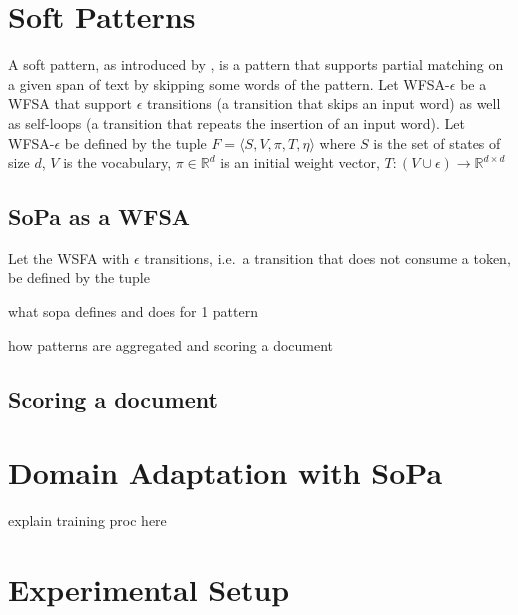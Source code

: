 \documentclass[11pt,a4paper]{article}
\begin{document}

\section{Soft Patterns}

A soft pattern, as introduced by \citet{davidov2010enhanced}, is a pattern that supports partial matching on a given span of text by skipping some words of the pattern.
Let WFSA-$\epsilon$ be a WFSA that support $\epsilon$ transitions (a transition that skips an input word) as well as self-loops (a transition that repeats the insertion of an input word).
Let WFSA-$\epsilon$ be defined by the tuple $F = \langle S,V,\pi, T, \eta \rangle$ where $S$ is the set of states of size $d$, $V$ is the vocabulary, $ \pi \in \mathbb{R}^d $ is an initial weight vector, $T: (V \cup \epsilon) \to \mathbb{R}^{d \times d}$

\subsection{SoPa as a WFSA}

Let the WSFA with $\epsilon$ transitions, i.e.\ a transition that does not consume a token, be defined by the tuple 

what sopa defines and does for 1 pattern


how patterns are aggregated and scoring a document


\subsection{Scoring a document}



\section{Domain Adaptation with SoPa}

explain training proc here


\section{Experimental Setup}
\end{document}
